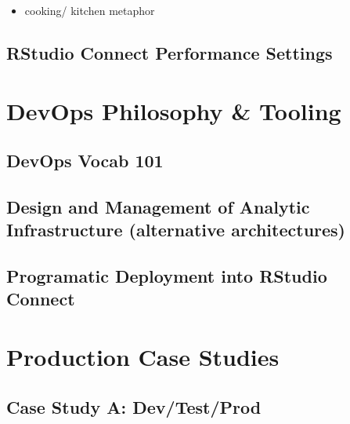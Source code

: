 \documentclass[]{book}
\providecommand{\tightlist}{%
  \setlength{\itemsep}{0pt}\setlength{\parskip}{0pt}}
\begin{document}
\begin{itemize}
\tightlist
\item
  cooking/ kitchen metaphor
\end{itemize}

\hypertarget{rstudio-connect-performance-settings}{%
\section{RStudio Connect Performance
Settings}\label{rstudio-connect-performance-settings}}

\hypertarget{devops-philosophy-tooling}{%
\chapter{DevOps Philosophy \& Tooling}\label{devops-philosophy-tooling}}

\hypertarget{devops-vocab-101}{%
\section{DevOps Vocab 101}\label{devops-vocab-101}}

\hypertarget{design-and-management-of-analytic-infrastructure-alternative-architectures}{%
\section{Design and Management of Analytic Infrastructure (alternative
architectures)}\label{design-and-management-of-analytic-infrastructure-alternative-architectures}}

\hypertarget{programatic-deployment-into-rstudio-connect}{%
\section{Programatic Deployment into RStudio
Connect}\label{programatic-deployment-into-rstudio-connect}}

\hypertarget{production-case-studies}{%
\chapter{Production Case Studies}\label{production-case-studies}}

\hypertarget{case-study-a-devtestprod}{%
\section{Case Study A: Dev/Test/Prod}\label{case-study-a-devtestprod}}
\end{document}

